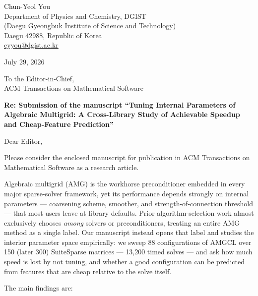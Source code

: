 \documentclass[11pt]{article}
\begin{document}
\noindent
Chun-Yeol You \\
Department of Physics and Chemistry, DGIST \\
(Daegu Gyeongbuk Institute of Science and Technology) \\
Daegu 42988, Republic of Korea \\
\href{mailto:cyyou@dgist.ac.kr}{cyyou@dgist.ac.kr}

\vspace{0.5em}
\noindent July 29, 2026

\vspace{1em}
\noindent To the Editor-in-Chief, \\
ACM Transactions on Mathematical Software

\vspace{1em}
\noindent\textbf{Re: Submission of the manuscript ``Tuning Internal Parameters
of Algebraic Multigrid: A Cross-Library Study of Achievable Speedup and
Cheap-Feature Prediction''}

\vspace{0.5em}
Dear Editor,

Please consider the enclosed manuscript for publication in ACM Transactions on
Mathematical Software as a research article.

Algebraic multigrid (AMG) is the workhorse preconditioner embedded in every
major sparse-solver framework, yet its performance depends strongly on internal
parameters --- coarsening scheme, smoother, and strength-of-connection
threshold --- that most users leave at library defaults. Prior
algorithm-selection work almost exclusively chooses \emph{among} solvers or
preconditioners, treating an entire AMG method as a single label. Our manuscript
instead opens that label and studies the interior parameter space empirically:
we sweep 88 configurations of AMGCL over 150 (later 300) SuiteSparse matrices
--- 13{,}200 timed solves --- and ask how much speed is lost by not tuning, and
whether a good configuration can be predicted from features that are cheap
relative to the solve itself.

The main findings are:
\end{document}
